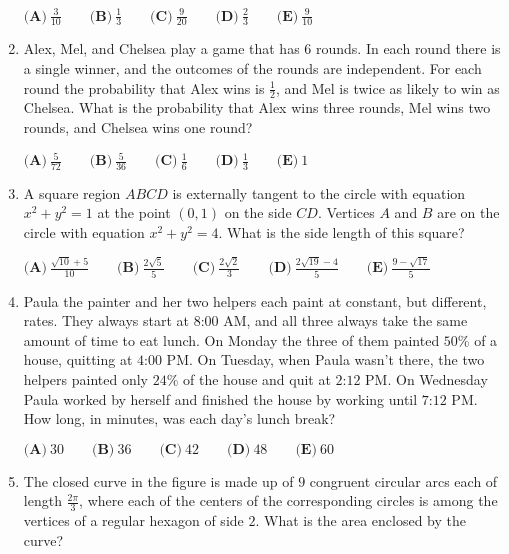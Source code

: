 \documentclass{article}
\begin{document}
\begin{enumerate}[label=\arabic*., itemsep=0.5em]
\( \textbf{(A)}\ \frac{3}{10}\qquad\textbf{(B)}\ \frac{1}{3}\qquad\textbf{(C)}\ \frac{9}{20}\qquad\textbf{(D)}\ \frac{2}{3}\qquad\textbf{(E)}\ \frac{9}{10} \)\par \vspace{0.5em}\item Alex, Mel, and Chelsea play a game that has \(6\) rounds.  In each round there is a single winner, and the outcomes of the rounds are independent.  For each round the probability that Alex wins is \(\frac{1}{2}\), and Mel is twice as likely to win as Chelsea.  What is the probability that Alex wins three rounds, Mel wins two rounds, and Chelsea wins one round?

\( \textbf{(A)}\ \frac{5}{72}\qquad\textbf{(B)}\ \frac{5}{36}\qquad\textbf{(C)}\ \frac{1}{6}\qquad\textbf{(D)}\ \frac{1}{3}\qquad\textbf{(E)}\ 1 \)\par \vspace{0.5em}\item A square region \(ABCD\) is externally tangent to the circle with equation \(x^2+y^2=1\) at the point \((0,1)\) on the side \(CD\).  Vertices \(A\) and \(B\) are on the circle with equation \(x^2+y^2=4\).  What is the side length of this square?

\( \textbf{(A)}\ \frac{\sqrt{10}+5}{10}\qquad\textbf{(B)}\ \frac{2\sqrt{5}}{5}\qquad\textbf{(C)}\ \frac{2\sqrt{2}}{3}\qquad\textbf{(D)}\ \frac{2\sqrt{19}-4}{5}\qquad\textbf{(E)}\ \frac{9-\sqrt{17}}{5} \)\par \vspace{0.5em}\item Paula the painter and her two helpers each paint at constant, but different, rates.  They always start at \(\text{8:00 AM}\), and all three always take the same amount of time to eat lunch.  On Monday the three of them painted \(50\%\) of a house, quitting at \(\text{4:00 PM}\).  On Tuesday, when Paula wasn't there, the two helpers painted only \(24\%\) of the house and quit at \(\text{2:12 PM}\).  On Wednesday Paula worked by herself and finished the house by working until \(\text{7:12 PM}\).  How long, in minutes, was each day's lunch break?

\( \textbf{(A)}\ 30
\qquad\textbf{(B)}\ 36
\qquad\textbf{(C)}\ 42
\qquad\textbf{(D)}\ 48
\qquad\textbf{(E)}\ 60
 \)\par \vspace{0.5em}\item The closed curve in the figure is made up of \(9\) congruent circular arcs each of length \(\frac{2\pi}{3}\), where each of the centers of the corresponding circles is among the vertices of a regular hexagon of side \(2\). What is the area enclosed by the curve? 



\end{enumerate}
\end{document}
